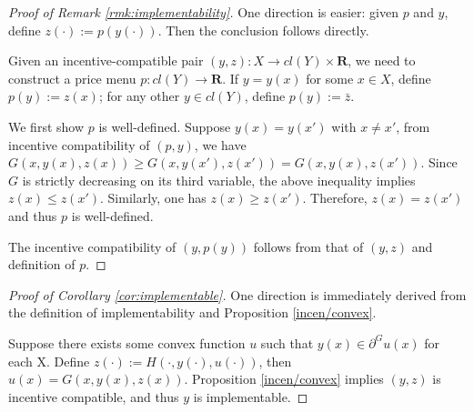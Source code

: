 \documentclass[a4paper, 11pt]{amsart}
\numberwithin{equation}{section}
\theoremstyle{plain}
\theoremstyle{definition}
\theoremstyle{remark}
\newcommand{\R}{\mathbf{R}}
\begin{document}
\vspace{0.3cm}

\begin{proof}[Proof of Remark \ref{rmk:implementability}]
	One direction is easier: given $p$ and $y$, define $z(\cdot):= p(y(\cdot))$. Then the conclusion follows directly. \medskip
	
	Given an incentive-compatible pair $(y, z): X \longrightarrow cl(Y) \times \R$, we need to construct a price menu $p: cl(Y)\longrightarrow \R$. If $y= y(x)$ for some $x\in X$, define $p(y):= z(x)$; for any other $y \in cl(Y)$, define $p(y) := \bar{z}$. \medskip
	
	We first show $p$ is well-defined. Suppose $y(x) = y(x')$ with $x\ne x'$, from incentive compatibility of $(p,y)$, we have $G(x,y(x), z(x)) \ge G(x, y(x'), z(x')) = G(x, y(x), z(x'))$. Since $G$ is strictly decreasing on its third variable, the above inequality implies $z(x) \le z(x')$. Similarly, one has $z(x) \ge z(x')$. Therefore, $z(x) = z(x')$ and thus $p$ is well-defined. \medskip
	
	The incentive compatibility of $(y, p(y))$ follows from that of $(y, z)$ and definition of $p$.
\end{proof}
\vspace{0.3cm}
\begin{proof}[Proof of Corollary \ref{cor:implementable}]
	One direction is immediately derived from the definition of implementability and Proposition \ref{incen/convex}.\medskip
	
	Suppose there exists some convex function $u$ such that $y(x) \in \partial^G u(x)$ for each X. Define $z(\cdot):= H(\cdot, y(\cdot), u(\cdot))$, then $u(x) = G(x, y(x), z(x))$.
	Proposition \ref{incen/convex} implies $(y, z)$ is incentive compatible, and thus $y$ is implementable.
\end{proof}
\vspace{0.3cm}
\end{document}
